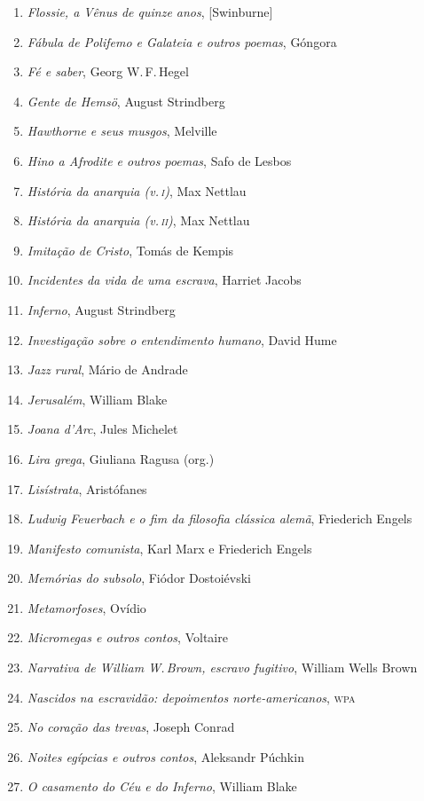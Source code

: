\begin{enumerate}
\item \textit{Flossie, a Vênus de quinze anos}, [Swinburne]
\item \textit{Fábula de Polifemo e Galateia e outros poemas}, Góngora
\item \textit{Fé e saber}, Georg W.\,F.\,Hegel
\item \textit{Gente de Hemsö}, August Strindberg 
\item \textit{Hawthorne e seus musgos}, Melville
\item \textit{Hino a Afrodite e outros poemas}, Safo de Lesbos 
\item \textit{História da anarquia (v.\,\textsc{i})}, Max Nettlau
\item \textit{História da anarquia (v.\,\textsc{ii})}, Max Nettlau
\item \textit{Imitação de Cristo}, Tomás de Kempis
\item \textit{Incidentes da vida de uma escrava}, Harriet Jacobs
\item \textit{Inferno}, August Strindberg
\item \textit{Investigação sobre o entendimento humano}, David Hume
\item \textit{Jazz rural}, Mário de Andrade
\item \textit{Jerusalém}, William Blake
\item \textit{Joana d'Arc}, Jules Michelet
\item \textit{Lira grega}, Giuliana Ragusa (org.)
\item \textit{Lisístrata}, Aristófanes 
\item \textit{Ludwig Feuerbach e o fim da filosofia clássica alemã}, Friederich Engels
\item \textit{Manifesto comunista}, Karl Marx e Friederich Engels
\item \textit{Memórias do subsolo}, Fiódor Dostoiévski
\item \textit{Metamorfoses}, Ovídio
\item \textit{Micromegas e outros contos}, Voltaire
\item \textit{Narrativa de William W.\,Brown, escravo fugitivo}, William Wells Brown
\item \textit{Nascidos na escravidão: depoimentos norte-americanos}, \textsc{wpa}
\item \textit{No coração das trevas}, Joseph Conrad
\item \textit{Noites egípcias e outros contos}, Aleksandr Púchkin
\item \textit{O casamento do Céu e do Inferno}, William Blake

\end{enumerate}
